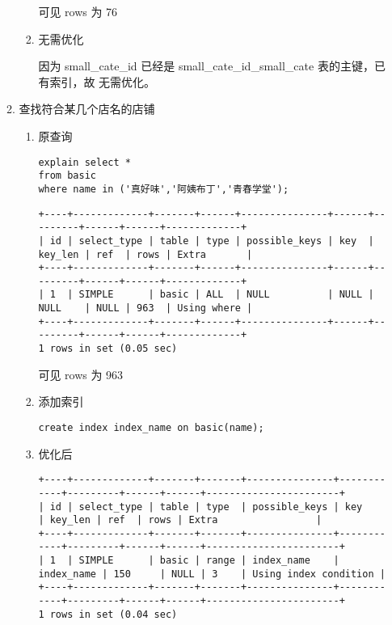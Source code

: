 \documentclass[11pt]{article}
\begin{document}
\begin{itemize}
\begin{enumerate}
\begin{enumerate}
可见 rows 为 76

\item 无需优化

因为 small\_cate\_id 已经是 small\_cate\_id\_small\_cate 表的主键，已有索引，故
无需优化。
\end{enumerate}

\item 查找符合某几个店名的店铺
\begin{enumerate}
\item 原查询

\begin{lstlisting}
explain select *
from basic
where name in ('真好味','阿姨布丁','青春学堂');
\end{lstlisting}

\begin{verbatim}
+----+-------------+-------+------+---------------+------+---------+------+------+-------------+
| id | select_type | table | type | possible_keys | key  | key_len | ref  | rows | Extra       |
+----+-------------+-------+------+---------------+------+---------+------+------+-------------+
| 1  | SIMPLE      | basic | ALL  | NULL          | NULL | NULL    | NULL | 963  | Using where |
+----+-------------+-------+------+---------------+------+---------+------+------+-------------+
1 rows in set (0.05 sec)
\end{verbatim}

可见 rows 为 963
\item 添加索引

\begin{lstlisting}
create index index_name on basic(name);
\end{lstlisting}

\item 优化后

\begin{verbatim}
+----+-------------+-------+-------+---------------+------------+---------+------+------+-----------------------+
| id | select_type | table | type  | possible_keys | key        | key_len | ref  | rows | Extra                 |
+----+-------------+-------+-------+---------------+------------+---------+------+------+-----------------------+
| 1  | SIMPLE      | basic | range | index_name    | index_name | 150     | NULL | 3    | Using index condition |
+----+-------------+-------+-------+---------------+------------+---------+------+------+-----------------------+
1 rows in set (0.04 sec)
\end{verbatim}


\end{enumerate}
\end{enumerate}
\end{itemize}
\end{document}
